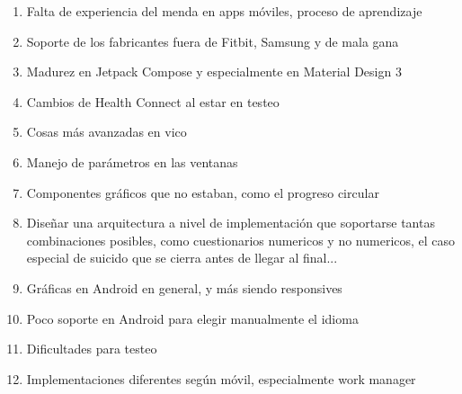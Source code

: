 \begin{enumerate}
    \item Falta de experiencia del menda en apps móviles, proceso de aprendizaje
    \item Soporte de los fabricantes fuera de Fitbit, Samsung y de mala gana
    \item Madurez en Jetpack Compose y especialmente en Material Design 3
    \item Cambios de Health Connect al estar en testeo
    \item Cosas más avanzadas en vico
    \item Manejo de parámetros en las ventanas
    \item Componentes gráficos que no estaban, como el progreso circular
    \item Diseñar una arquitectura a nivel de implementación que soportarse tantas combinaciones posibles, como cuestionarios numericos y no numericos, el caso especial de suicido que se cierra antes de llegar al final...
    \item Gráficas en Android en general, y más siendo responsives
    \item Poco soporte en Android para elegir manualmente el idioma
    
    \item Dificultades para testeo
    \item Implementaciones diferentes según móvil, especialmente work manager
    
\end{enumerate}